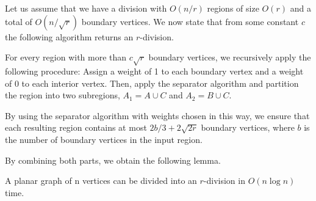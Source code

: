 Let us assume that we have a division with $O(n/r)$ regions of size $O(r)$ and a total of $O(n/\sqrt{r})$ boundary vertices. We now state that from some constant $c$ the following algorithm returns an $r$-division.

\begin{alg}
For every region with more than $c\sqrt{r}$ boundary vertices, we recursively apply the following procedure:
Assign a weight of 1 to each boundary vertex and a weight of 0 to each interior vertex. Then, apply the separator algorithm and partition the region into two subregions, $A_1 = A \cup C$ and $A_2 = B \cup C$.
\end{alg}

By using the separator algorithm with weights chosen in this way, we ensure that each resulting region contains at most $2b/3 + 2\sqrt{2r}$ boundary vertices, where $b$ is the number of boundary vertices in the input region.

By combining both parts, we obtain the following lemma.

\begin{lemma}
\label{r-d-lemma}
A planar graph of n vertices can be divided into an $r$-division in $O(n \log n)$ time.
\end{lemma}

